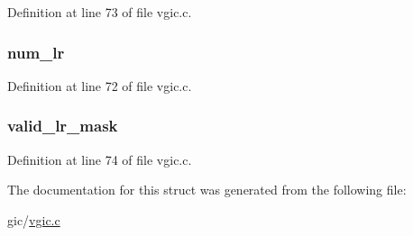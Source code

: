 \-Definition at line 73 of file vgic.\-c.

\hypertarget{structvgic_a3f8cdfb8059b41928a4b6f2b0ec89b3c}{
\subsubsection[{num\-\_\-lr}]{ {\bf num\-\_\-lr}}}\label{structvgic_a3f8cdfb8059b41928a4b6f2b0ec89b3c}


\-Definition at line 72 of file vgic.\-c.

\hypertarget{structvgic_a4d94225ddadd984b2a9c8184c960902c}{
\subsubsection[{valid\-\_\-lr\-\_\-mask}]{ {\bf valid\-\_\-lr\-\_\-mask}}}\label{structvgic_a4d94225ddadd984b2a9c8184c960902c}


\-Definition at line 74 of file vgic.\-c.



\-The documentation for this struct was generated from the following file\-:\begin{DoxyCompactItemize}
\item 
gic/\hyperlink{vgic_8c}{vgic.\-c}\end{DoxyCompactItemize}
